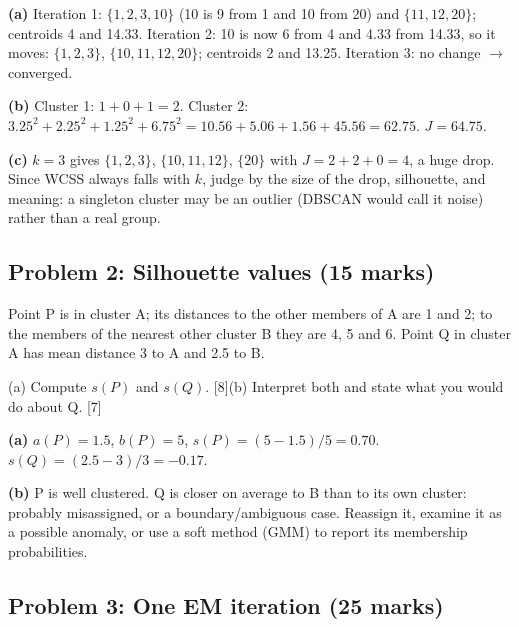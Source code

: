 \documentclass[11pt]{article}
\begin{document}
\begin{soln}\textbf{(a)} Iteration 1: $\{1,2,3,10\}$ (10 is 9 from 1 and 10 from 20) and $\{11,12,20\}$; centroids 4 and 14.33. Iteration 2: 10 is now 6 from 4 and 4.33 from 14.33, so it moves: $\{1,2,3\}$, $\{10,11,12,20\}$; centroids 2 and 13.25. Iteration 3: no change $\rightarrow$ converged.

\textbf{(b)} Cluster 1: $1+0+1=2$. Cluster 2: $3.25^2+2.25^2+1.25^2+6.75^2=10.56+5.06+1.56+45.56=62.75$. $J=\mathbf{64.75}$.

\textbf{(c)} $k=3$ gives $\{1,2,3\}$, $\{10,11,12\}$, $\{20\}$ with $J=2+2+0=4$, a huge drop. Since WCSS always falls with $k$, judge by the size of the drop, silhouette, and meaning: a singleton cluster may be an outlier (DBSCAN would call it noise) rather than a real group.\end{soln}

\subsection{Problem 2: Silhouette values \normalfont\small\color{GreyN}(15 marks)}

\begin{prob}Point P is in cluster A; its distances to the other members of A are 1 and 2; to the members of the nearest other cluster B they are 4, 5 and 6. Point Q in cluster A has mean distance 3 to A and 2.5 to B.

(a) Compute $s(P)$ and $s(Q)$. [8]\newline (b) Interpret both and state what you would do about Q. [7]\end{prob}

\begin{soln}\textbf{(a)} $a(P)=1.5$, $b(P)=5$, $s(P)=(5-1.5)/5=\mathbf{0.70}$. $s(Q)=(2.5-3)/3=\mathbf{-0.17}$.

\textbf{(b)} P is well clustered. Q is closer on average to B than to its own cluster: probably misassigned, or a boundary/ambiguous case. Reassign it, examine it as a possible anomaly, or use a soft method (GMM) to report its membership probabilities.\end{soln}

\subsection{Problem 3: One EM iteration \normalfont\small\color{GreyN}(25 marks)}
\end{document}
